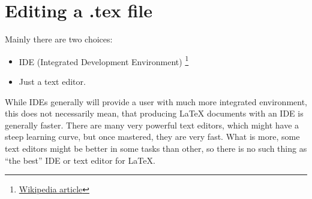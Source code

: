 \documentclass[a4paper]{article}
\begin{document}
\section{Editing a .tex file}

Mainly there are two choices:
\begin{itemize}
    \item IDE (Integrated Development Environment)
        \footnote{\href{https://secure.wikimedia.org/wikipedia/en/wiki/Integrated_development_environment}{Wikipedia
        article}}
    \item Just a text editor.
\end{itemize}

While IDEs generally will provide a user with much more integrated environment,
this does not necessarily mean, that producing \LaTeX{} documents with an IDE is
generally faster. There are many very powerful text editors, which might have a
steep learning curve, but once mastered, they are very fast. What is more, some
text editors might be better in some tasks than other, so there is no such thing
as ``the best'' IDE or text editor for \LaTeX{}.
\end{document}
